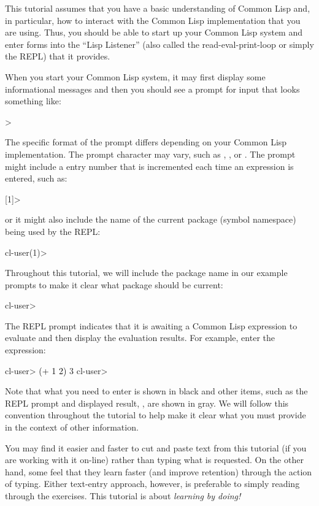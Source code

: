 \documentclass[10pt,twoside,english,pdftex]{article}
\begin{document}
%
This tutorial assumes that you have a basic understanding of Common Lisp and,
in particular, how to interact with the Common Lisp implementation that you
are using.  Thus, you should be able to start up your Common Lisp system and
enter forms into the ``Lisp Listener'' (also called the read-eval-print-loop
or simply the REPL) that it provides.  

When you start your Common Lisp system, it may first display some informational
messages and then you should see a prompt for input that looks something like:
%
\W\supp
\begin{example}
\textcolor{darkergray}{%
  >}
\end{example}
%
The specific format of the prompt differs depending on your Common Lisp
implementation.  The prompt character may vary, such as \code{*}, \code{:}, or
.  The prompt might include a entry number that is incremented each
time an expression is entered, such as:
%
\W\supp\notpretop
\begin{example}
\textcolor{darkergray}{%
  [1]>}
\end{example}
%
or it might also include the name of the current package (symbol namespace)
being used by the REPL:
%
\W\supp\notpretop
\begin{example}
\textcolor{darkergray}{%
  cl-user(1)>}
\end{example}

Throughout this tutorial, we will include the package name in our
example prompts to make it clear what package should be current:
%
\W\supp
\begin{example}%
\textcolor{darkergray}{%
  cl-user>}
\end{example}
%
The REPL prompt indicates that it is awaiting a Common Lisp expression to
evaluate and then display the evaluation results. For example, enter the
expression:
%
\W\supp\notpretop
\begin{example}
\textcolor{darkergray}{%
  cl-user> \textcolor{black}{(+ 1 2)}
  3
  cl-user>}
\end{example}
%
Note that what you need to enter is shown in black and other items, such as
the REPL prompt and displayed result, , are shown in gray.  We will
follow this convention throughout the tutorial to help make it clear what you
must provide in the context of other information.

You may find it easier and faster to cut and paste text from this tutorial (if
you are working with it on-line) rather than typing what is requested.  On the
other hand, some feel that they learn faster (and improve retention) through
the action of typing.  Either text-entry approach, however, is preferable to
simply reading through the exercises.  This tutorial is about \textit{learning by doing!}
\end{document}
